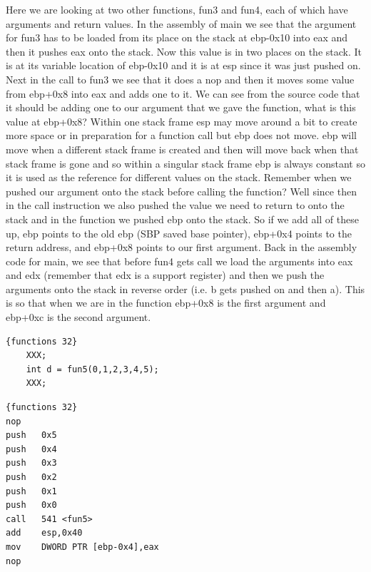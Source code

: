 \documentclass{report}
\begin{document}
 Here we are looking at two other functions, fun3 and fun4, each of which have arguments and return values.  In the assembly of main we see that the argument for fun3 has to be loaded from its place on the stack at ebp-0x10 into eax and then it pushes eax onto the stack.  Now this value is in two places on the stack.  It is at its variable location of ebp-0x10 and it is at esp since it was just pushed on.  Next in the call to fun3 we see that it does a nop and then it moves some value from ebp+0x8 into eax and adds one to it.  We can see from the source code that it should be adding one to our argument that we gave the function, what is this value at ebp+0x8?  Within one stack frame esp may move around a bit to create more space or in preparation for a function call but ebp does not move.  ebp will move when a different stack frame is created and then will move back when that stack frame is gone and so within a singular stack frame ebp is always constant so it is used as the reference for different values on the stack.  Remember when we pushed our argument onto the stack before calling the function?  Well since then in the call instruction we also pushed the value we need to return to onto the stack and in the function we pushed ebp onto the stack.  So if we add all of these up, ebp points to the old ebp (SBP saved base pointer), ebp+0x4 points to the return address, and ebp+0x8 points to our first argument.  Back in the assembly code for main, we see that before fun4 gets call we load the arguments into eax and edx (remember that edx is a support register) and then we push the arguments onto the stack in reverse order (i.e. b gets pushed on and then a).  This is so that when we are in the function ebp+0x8 is the first argument and ebp+0xc is the second argument.\newline
\begin{minipage}{.45\textwidth}
\begin{lstlisting}[caption=Function calls,frame=tlrb]{functions 32}
    XXX;
    int d = fun5(0,1,2,3,4,5);
    XXX;

\end{lstlisting}
\end{minipage}\hfill
\begin{minipage}{.45\textwidth}
\begin{lstlisting}[caption=assembly 32bit (Main),frame=tlrb]{functions 32}
nop
push   0x5
push   0x4
push   0x3
push   0x2
push   0x1
push   0x0
call   541 <fun5>
add    esp,0x40
mov    DWORD PTR [ebp-0x4],eax
nop


\end{lstlisting}
\end{minipage}
\end{document}

